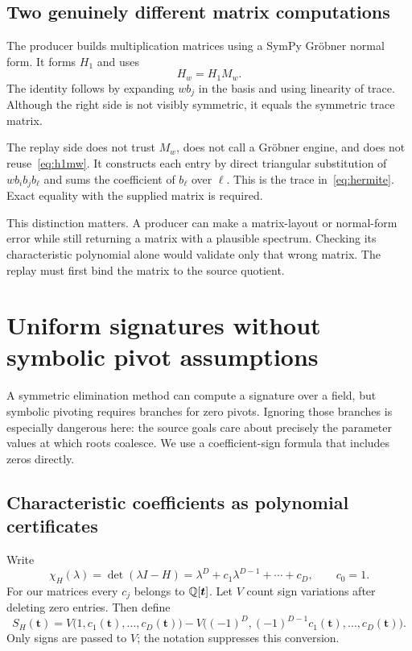 \subsection{Two genuinely different matrix computations}

The producer builds multiplication matrices using a SymPy Gr\"obner normal form. It forms $H_1$ and uses
\begin{equation}\label{eq:h1mw}
H_w=H_1M_w.
\end{equation}
The identity follows by expanding $wb_j$ in the basis and using linearity of trace. Although the right side is not visibly symmetric, it equals the symmetric trace matrix.

The replay side does not trust $M_w$, does not call a Gr\"obner engine, and does not reuse~\eqref{eq:h1mw}. It constructs each entry by direct triangular substitution of $wb_ib_jb_\ell$ and sums the coefficient of $b_\ell$ over $\ell$. This is the trace in~\eqref{eq:hermite}. Exact equality with the supplied matrix is required.

This distinction matters. A producer can make a matrix-layout or normal-form error while still returning a matrix with a plausible spectrum. Checking its characteristic polynomial alone would validate only that wrong matrix. The replay must first bind the matrix to the source quotient.

\section{Uniform signatures without symbolic pivot assumptions}\label{sec:signature}

A symmetric elimination method can compute a signature over a field, but symbolic pivoting requires branches for zero pivots. Ignoring those branches is especially dangerous here: the source goals care about precisely the parameter values at which roots coalesce. We use a coefficient-sign formula that includes zeros directly.

\subsection{Characteristic coefficients as polynomial certificates}

Write
\begin{equation}\label{eq:charpoly}
\chi_H(\lambda)=\det(\lambda I-H)
=\lambda^D+c_1\lambda^{D-1}+\cdots+c_D,
\qquad c_0=1.
\end{equation}
For our matrices every $c_j$ belongs to $\mathbb Q[\bm t]$. Let $V$ count sign variations after deleting zero entries. Then define
\begin{equation}\label{eq:sigformula}
S_H(\bm t)=
V\bigl(1,c_1(\bm t),\ldots,c_D(\bm t)\bigr)
-V\bigl((-1)^D,(-1)^{D-1}c_1(\bm t),\ldots,c_D(\bm t)\bigr).
\end{equation}
Only signs are passed to $V$; the notation suppresses this conversion.

